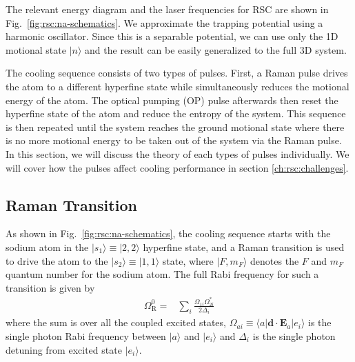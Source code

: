 The relevant energy diagram and the laser frequencies for RSC are shown in
Fig.~\ref{fig:rsc:na-schematics}.
We approximate the trapping potential using a harmonic oscillator.
Since this is a separable potential, we can use only the 1D motional state $|n\rangle$
and the result can be easily generalized to the full 3D system.

The cooling sequence consists of two types of pulses.
First, a Raman pulse drives the atom to a different hyperfine state while simultaneously
reduces the motional energy of the atom.
The optical pumping (OP) pulse afterwards then reset the hyperfine state of the atom
and reduce the entropy of the system.
This sequence is then repeated until the system reaches the ground motional state
where there is no more motional energy to be taken out of the system via the Raman pulse.
In this section, we will discuss the theory of each types of pulses individually.
We will cover how the pulses affect cooling performance in section \ref{ch:rsc:challenges}.

\subsection{Raman Transition}
\label{ch:rsc:basic-theory:raman}

As shown in Fig.~\ref{fig:rsc:na-schematics},
the cooling sequence starts with the sodium atom in the
$|s_1\rangle\equiv|2,2\rangle$ hyperfine state,
and a Raman transition is used to drive the atom to the $|s_2\rangle\equiv|1,1\rangle$ state,
where $|F,m_F\rangle$ denotes the $F$ and $m_F$ quantum number for the sodium atom.
The full Rabi frequency for such a transition is given by
\begin{align}
  \Omega_{\mathrm{R}}^0=&\sum_{i}\frac{\Omega_{1i}\Omega_{2i}^*}{2\Delta_i}\label{eq:rsc:basic-theory:raman-rabi}
\end{align}
where the sum is over all the coupled excited states,
$\Omega_{ai}\equiv\langle a|\mathbf{d}\cdot\mathbf{E}_a|e_i\rangle$ is the single photon
Rabi frequency between $|a\rangle$ and $|e_i\rangle$
and $\Delta_i$ is the single photon detuning from excited state $|e_i\rangle$.


